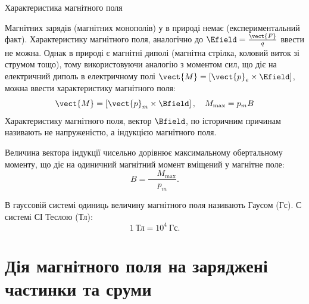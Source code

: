 \documentclass{beamer}
\begin{document}
\begin{frame}{Характеристика магнітного поля}{}\small
	\begin{block}{}\justifying
		Магнітних зарядів (магнітних монополів) у в природі немає (експериментальний факт). Характеристику магнітного поля, аналогічно до $\Efield =
			\frac{\vect{F}}{q}$
		ввести не можна. Однак в природі є магнітні диполі (магнітна стрілка, коловий виток зі струмом тощо), тому використовуючи аналогію з моментом
		сил, що діє на електричний диполь в електричному полі $ \vect{M} = \left[\vect{p}_e \times\Efield\right] $, можна ввести характеристику
		магнітного поля:
		\begin{equation*}
			\vect{M} = \left[\vect{p}_m \times\Bfield\right], \quad M_{\max} = p_m B
		\end{equation*}
		Характеристику магнітного поля, вектор $\Bfield$, по історичним причинам називають не \alert{напруженістю}, а \alert{індукцією} магнітного поля.
	\end{block}
	\begin{overprint}
		\begin{block}{}\justifying
			Величина вектора індукції чисельно дорівнює максимальному обертальному моменту, що діє на одиничний магнітний момент вміщений у магнітне поле:
			\begin{equation*}
				B = \frac{\quad M_{\max}}{p_m}.
			\end{equation*}
		\end{block}
		\begin{alertblock}{}\justifying
			В гауссовій системі одиниць величину магнітного поля називають Гаусом (Гс). С системі СІ Теслою (Тл):
			\begin{equation*}
				1\ \text{Тл} = 10^4\ \text{Гс}.
			\end{equation*}
		\end{alertblock}
	\end{overprint}
\end{frame}



\section{Дія магнітного поля на заряджені частинки та сруми}
\end{document}
